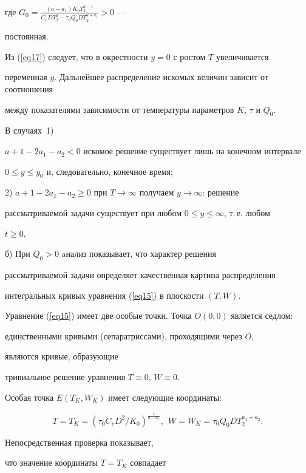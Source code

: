 где $G_0=\frac{(a-a_1)K_0T_2^{a-1}}{C_vDT_2^2-\tau_0Q_0DT_2^{a+a_1}}>0$ ---


постоянная.


Из (\ref{eq17}) следует, что в окрестности $y=0$ с ростом $T$ увеличивается


переменная $y$. Дальнейшее распределение искомых величин зависит от соотношения


между показателями зависимости от температуры параметров $K$, $\tau$ и $Q_0$.


В случаях~1) 


$a+1-2a_1-a_2<0$ искомое решение существует лишь на конечном интервале


$0\le y\le y_0$ и, следовательно, конечное время;


2) $a+1-2a_1-a_2\ge0$ при $T\to\infty$ получаем $y\to\infty$: решение


рассматриваемой задачи существует при любом $0\le y\le\infty$, т.\,е. любом


$t\ge0$.





б) При $Q_0>0$ aнализ показывает, что характер решения


рассматриваемой задачи определяет качественная картина распределения


интегральных кривых уравнения (\ref{eq15}) в плоскости $(T,W)$.





Уравнение (\ref{eq15}) имеет две особые точки. Точка $O(0,0)$ является седлом:


единственными кривыми (сепаратриссами), проходящими через $O$,


являются кривые, образующие


тривиальное решение уравнения $T\equiv0$, $W\equiv0$.


Особая точка $E(T_K,W_K)$ имеет следующие координаты:


$$




T=T_K=(\tau_0C_vD^2/K_0)^{\frac{1}{a-a_1}},


\ \ W=W_K=\tau_0Q_0DT_2^{a_1+a_2}.




$$


Непосредственная проверка показывает, 


что значение координаты $T=T_K$ совпадает


